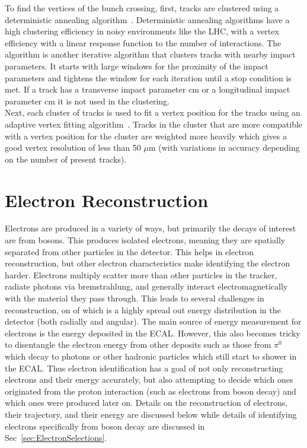	To find the vertices of the bunch crossing, first, tracks are clustered using a deterministic annealing algorithm~\cite{davtx, dacms}. Deterministic annealing algorithms have a high clustering efficiency in noisy environments like the LHC, with a vertex efficiency with a linear response function to the number of interactions. The algorithm is another iterative algorithm that clusters tracks with nearby impact parameters. It starts with large windows for the proximity of the impact parameters and tightens the window for each iteration until a stop condition is met. If a track has a transverse impact parameter  cm or a longitudinal impact parameter  cm it is not used in the clustering.\\
	
	Next, each cluster of tracks is used to fit a vertex position for the tracks using an adaptive vertex fitting algorithm~\cite{vertexing,vtxfit}. Tracks in the cluster that are more compatible with a vertex position for the cluster are weighted more heavily which gives a good vertex resolution of less than 50 $\mu$m (with variations in accuracy depending on the number of present tracks).\\ 
	
	
	\section{Electron Reconstruction}
	Electrons are produced in a variety of ways, but primarily the decays of interest are from bosons. This produces isolated electrons, meaning they are spatially separated from other particles in the detector. This helps in electron reconstruction, but other electron characteristics make identifying the electron harder. Electrons multiply scatter more than other particles in the tracker, radiate photons via bremstrahlung, and generally interact electromagnetically with the material they pass through. This leads to several challenges in reconstruction, on of which is a highly spread out energy distribution in the detector (both radially and angular). The main source of energy measurement for electrons is the energy deposited in the ECAL. However, this also becomes tricky to disentangle the electron energy from other deposits such as those from $\pi ^0$ which decay to photons or other hadronic particles which still start to shower in the ECAL. Thus electron identification has a goal of not only reconstructing electrons and their energy accurately, but also attempting to decide which ones originated from the proton interaction (such as electrons from boson decay) and which ones were produced later on. Details on the reconstruction of electrons, their trajectory, and their energy are discussed below while details of identifying electrons specifically from boson decay are discussed in Sec~\ref{sec:ElectronSelections}.\\
	
